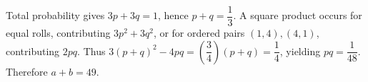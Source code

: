 Total probability gives $3p+3q=1$, hence $p+q=\dfrac{1}{3}$. A square product occurs for equal rolls, contributing $3p^2+3q^2$, or for ordered pairs $(1,4),(4,1)$, contributing $2pq$. Thus $3(p+q)^2-4pq=(\dfrac{3}{4})(p+q)=\dfrac{1}{4}$, yielding $pq=\dfrac{1}{48}$. Therefore $\boxed{a+b=49}$.
